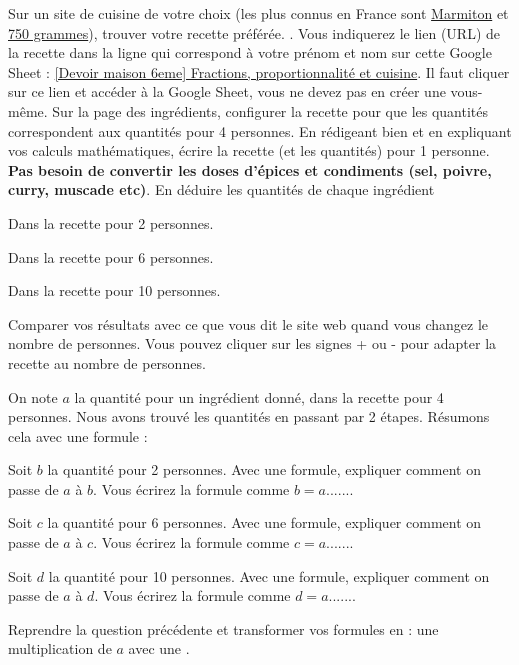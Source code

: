 \documentclass{exam}
\begin{document}
\begin{questions}
  \question Sur un site de cuisine de votre choix (les plus connus en France sont \href{https://www.marmiton.org/}{Marmiton} et \href{https://www.750g.com/}{750 grammes}), trouver votre recette préférée. .
  \question Vous indiquerez le lien (URL) de la recette dans la ligne qui correspond à votre prénom et nom sur cette Google Sheet : \href{https://docs.google.com/spreadsheets/d/1Wa0nSyUcOhiXLJ0kbh3Fd7_7XqcnUpJxdxPiZI1lJ5U/edit?gid=0\#gid=0}{[Devoir maison 6eme] Fractions, proportionnalité et cuisine}. Il faut cliquer sur ce lien et accéder à la Google Sheet, vous ne devez pas en créer une vous-même.
  \question Sur la page des ingrédients, configurer la recette pour que les quantités correspondent aux quantités pour 4 personnes.
  \question En rédigeant bien et en expliquant vos calculs mathématiques, écrire la recette (et les quantités) pour 1 personne. \textbf{Pas besoin de convertir les doses d'épices et condiments (sel, poivre, curry, muscade etc)}. 
  \question En déduire les quantités de chaque ingrédient 
    \begin{parts}
      \item Dans la recette pour 2 personnes. 
      \item Dans la recette pour 6 personnes.  
      \item Dans la recette pour 10 personnes. 
    \end{parts}
  \question Comparer vos résultats avec ce que vous dit le site web quand vous changez le nombre de personnes. Vous pouvez cliquer sur les signes + ou - pour adapter la recette au nombre de personnes. 


  \question On note $a$ la quantité pour un ingrédient donné, dans la recette pour 4 personnes. Nous avons trouvé les quantités en passant par 2 étapes. Résumons cela avec une formule :
  \begin{parts}
    \item Soit $b$ la quantité pour 2 personnes. Avec une formule, expliquer comment on passe de $a$ à $b$. Vous écrirez la formule comme $b = a ... ... $.
    \item Soit $c$ la quantité pour 6 personnes. Avec une formule, expliquer comment on passe de $a$ à $c$. Vous écrirez la formule comme $c = a ... ... $.
    \item Soit $d$ la quantité pour 10 personnes. Avec une formule, expliquer comment on passe de $a$ à $d$. Vous écrirez la formule comme $d = a ... ... $.
  \end{parts}
  \question Reprendre la question précédente et transformer vos formules en  : une multiplication de $a$ avec une .
  \begin{parts}

\end{parts}
\end{questions}
\end{document}
